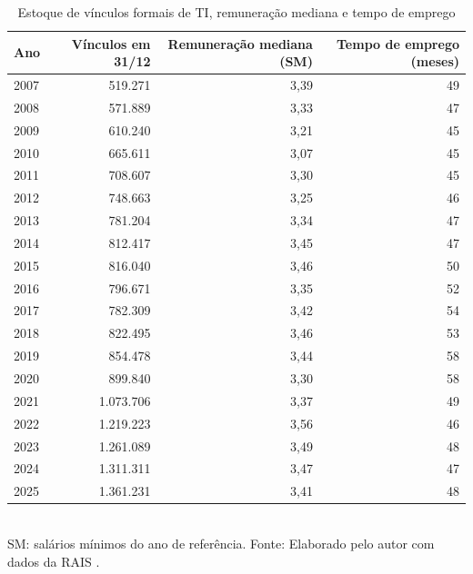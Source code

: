 \begin{table}[htbp]
    \centering
    \caption{Estoque de vínculos formais de TI, remuneração mediana e tempo de emprego}
    \label{tab:estoque-serie}
    \footnotesize
    \renewcommand{\arraystretch}{1.25}
    \begin{tabular}{lrrr}
        \toprule
        \rowcolor{black!8}
        \textbf{Ano} & \textbf{Vínculos em 31/12} & \textbf{Remuneração mediana (SM)} & \textbf{Tempo de emprego (meses)} \\
        \midrule
        2007 & 519.271 & 3,39 & 49 \\
        2008 & 571.889 & 3,33 & 47 \\
        2009 & 610.240 & 3,21 & 45 \\
        2010 & 665.611 & 3,07 & 45 \\
        2011 & 708.607 & 3,30 & 45 \\
        2012 & 748.663 & 3,25 & 46 \\
        2013 & 781.204 & 3,34 & 47 \\
        2014 & 812.417 & 3,45 & 47 \\
        2015 & 816.040 & 3,46 & 50 \\
        2016 & 796.671 & 3,35 & 52 \\
        2017 & 782.309 & 3,42 & 54 \\
        2018 & 822.495 & 3,46 & 53 \\
        2019 & 854.478 & 3,44 & 58 \\
        2020 & 899.840 & 3,30 & 58 \\
        2021 & 1.073.706 & 3,37 & 49 \\
        2022 & 1.219.223 & 3,56 & 46 \\
        2023 & 1.261.089 & 3,49 & 48 \\
        2024 & 1.311.311 & 3,47 & 47 \\
        2025 & 1.361.231 & 3,41 & 48 \\
        \bottomrule
    \end{tabular}
    \\[4pt]
    SM: salários mínimos do ano de referência. Fonte: Elaborado pelo autor com dados da RAIS \cite{RAIS2024}.
\end{table}
